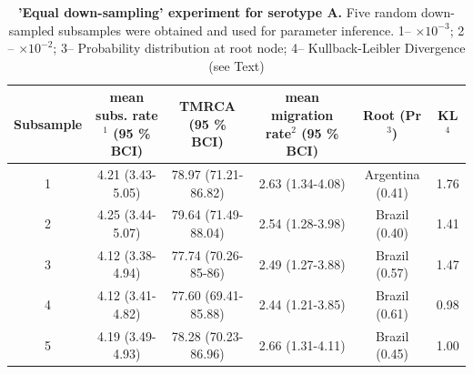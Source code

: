 \documentclass[a4paper,10pt]{article}
\begin{document}
\newpage
\begin{table}
\medskip
\begin{minipage}{\textwidth} 
\begin{center}
\caption{ {{\bf 'Equal down-sampling' experiment for serotype A.}} 
Five random down-sampled subsamples were obtained and used for parameter inference.
1-- $\times 10^{-3}$; 2 -- $\times 10^{-2}$; 3-- Probability distribution at root node; 4-- Kullback-Leibler Divergence (see Text) }
\begin{tabular}{cccccc}
\toprule
Subsample	&mean subs. rate$^{1}$ (95 \% BCI)	&TMRCA (95 \% BCI)	&mean migration rate$^{2}$  (95 \% BCI)	&Root (Pr$^{3}$)& KL$^4$\\
\midrule
1	&4.21 (3.43-5.05)	&78.97 (71.21-86.82)	&2.63 (1.34-4.08)	&Argentina (0.41)& 1.76\\
2	&4.25 (3.44-5.07)	&79.64 (71.49-88.04)	&2.54 (1.28-3.98)	&Brazil (0.40)& 1.41\\
3	&4.12 (3.38-4.94)	&77.74 (70.26-85-86)	&2.49 (1.27-3.88)	&Brazil (0.57)&1.47\\
4	&4.12 (3.41-4.82)	&77.60 (69.41-85.88)	&2.44 (1.21-3.85)	&Brazil (0.61)&0.98\\
5	&4.19 (3.49-4.93)	&78.28 (70.23-86.96)	&2.66 (1.31-4.11)	&Brazil (0.45)& 1.00\\
\bottomrule
\end{tabular}
\label{stab:ED_A}
\end{center}
\end{minipage}
\end{table}
\end{document}
